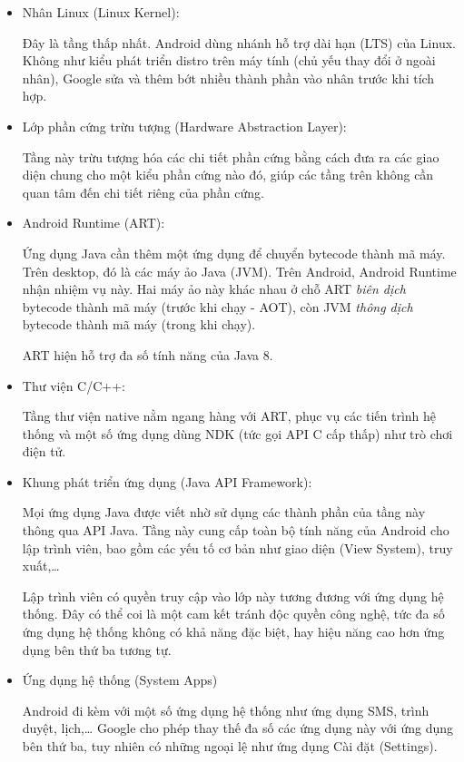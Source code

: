 \begin{itemize}
  \item
        Nhân Linux (Linux Kernel):

        Đây là tầng thấp nhất. Android dùng nhánh hỗ trợ dài hạn (LTS) của
        Linux. Không như kiểu phát triển distro trên máy tính (chủ yếu thay
        đổi ở ngoài nhân), Google sửa và thêm bớt nhiều thành phần vào nhân
        trước khi tích hợp.
  \item
        Lớp phần cứng trừu tượng (Hardware Abstraction Layer):

        Tầng này trừu tượng hóa các chi tiết phần cứng bằng cách đưa ra các
        giao diện chung cho một kiểu phần cứng nào đó, giúp các tầng trên
        không cần quan tâm đến chi tiết riêng của phần cứng.
  \item
        Android Runtime (ART):

        Ứng dụng Java cần thêm một ứng dụng để chuyển bytecode thành mã máy.
        Trên desktop, đó là các máy ảo Java (JVM). Trên Android, Android
        Runtime nhận nhiệm vụ này. Hai máy ảo này khác nhau ở chỗ ART
        \emph{biên dịch} bytecode thành mã máy (trước khi chạy - AOT), còn JVM
        \emph{thông dịch} bytecode thành mã máy (trong khi chạy).

        ART hiện hỗ trợ đa số tính năng của Java 8.
  \item
        Thư viện C/C++:

        Tầng thư viện native nằm ngang hàng với ART, phục vụ các tiến trình hệ
        thống và một số ứng dụng dùng NDK (tức gọi API C cấp thấp) như trò
        chơi điện tử.
  \item
        Khung phát triển ứng dụng (Java API Framework):

        Mọi ứng dụng Java được viết nhờ sử dụng các thành phần của tầng này
        thông qua API Java. Tầng này cung cấp toàn bộ tính năng của Android
        cho lập trình viên, bao gồm các yếu tố cơ bản như giao diện (View
        System), truy xuất,\ldots{}

        Lập trình viên có quyền truy cập vào lớp này tương đương với ứng dụng
        hệ thống. Đây có thể coi là một cam kết tránh độc quyền công nghệ, tức
        đa số ứng dụng hệ thống không có khả năng đặc biệt, hay hiệu năng cao
        hơn ứng dụng bên thứ ba tương tự.
  \item
        Ứng dụng hệ thống (System Apps)

        Android đi kèm với một số ứng dụng hệ thống như ứng dụng SMS, trình
        duyệt, lịch,\ldots{} Google cho phép thay thế đa số các ứng dụng này
        với ứng dụng bên thứ ba, tuy nhiên có những ngoại lệ như ứng dụng Cài
        đặt (Settings).
\end{itemize}

